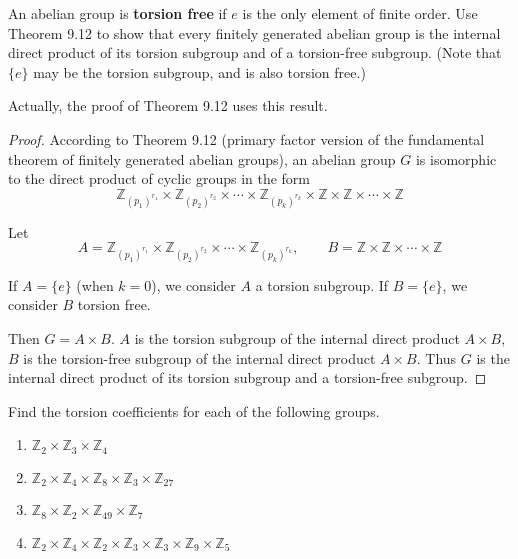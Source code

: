 \newpage
\begin{exercise}
    An abelian group is \textbf{torsion free} if $e$ is the only element of finite order. Use Theorem 9.12 to show that every finitely generated abelian group is the internal direct product of its torsion subgroup and of a torsion-free subgroup. (Note that $\{e\}$ may be the torsion subgroup, and is also torsion free.)
\end{exercise}

Actually, the proof of Theorem 9.12 uses this result.

\begin{proof}
    According to Theorem 9.12 (primary factor version of the fundamental theorem of finitely generated abelian groups), an abelian group $G$ is isomorphic to the direct product of cyclic groups in the form
    \[
        \mathbb{Z}_{{(p_{1})}^{r_{1}}} \times \mathbb{Z}_{{(p_{2})}^{r_{2}}} \times \cdots \times \mathbb{Z}_{{(p_{k})}^{r_{k}}} \times \mathbb{Z} \times \mathbb{Z} \times \cdots \times \mathbb{Z}
    \]

    Let
    \[
        A = \mathbb{Z}_{{(p_{1})}^{r_{1}}} \times \mathbb{Z}_{{(p_{2})}^{r_{2}}} \times \cdots \times \mathbb{Z}_{{(p_{k})}^{r_{k}}},\qquad B = \mathbb{Z} \times \mathbb{Z} \times \cdots \times \mathbb{Z}
    \]

    If $A = \{e\}$ (when $k = 0$), we consider $A$ a torsion subgroup. If $B = \{e\}$, we consider $B$ torsion free.

    Then $G = A\times B$. $A$ is the torsion subgroup of the internal direct product $A\times B$, $B$ is the torsion-free subgroup of the internal direct product $A\times B$. Thus $G$ is the internal direct product of its torsion subgroup and a torsion-free subgroup.
\end{proof}

\newpage
\begin{exercise}
    Find the torsion coefficients for each of the following groups.
    \begin{enumerate}[label={\textbf{\alph*.}}]
        \item $\mathbb{Z}_{2} \times \mathbb{Z}_{3} \times \mathbb{Z}_{4}$
        \item $\mathbb{Z}_{2} \times \mathbb{Z}_{4} \times \mathbb{Z}_{8} \times \mathbb{Z}_{3} \times \mathbb{Z}_{27}$
        \item $\mathbb{Z}_{8} \times \mathbb{Z}_{2} \times \mathbb{Z}_{49} \times \mathbb{Z}_{7}$
        \item $\mathbb{Z}_{2} \times \mathbb{Z}_{4} \times \mathbb{Z}_{2} \times \mathbb{Z}_{3} \times \mathbb{Z}_{3} \times \mathbb{Z}_{9} \times \mathbb{Z}_{5}$
    \end{enumerate}
\end{exercise}


